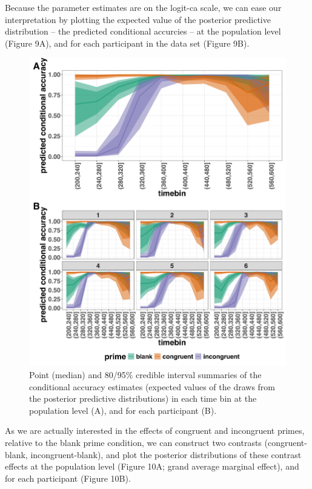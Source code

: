 \documentclass[
  man, donotrepeattitle,floatsintext]{apa6}
\begin{document}
Because the parameter estimates are on the logit-ca scale, we can ease our interpretation by plotting the expected value of the posterior predictive distribution -- the predicted conditional accurcies -- at the population level (Figure 9A), and for each participant in the data set (Figure 9B).



\begin{figure}[H]

{\centering \includegraphics[width=0.8\linewidth,height=0.67\textheight,]{../Tutorial_2_Bayesian/figures/M1i_ca_pred_combined} 

}

\caption{Point (median) and 80/95\% credible interval summaries of the conditional accuracy estimates (expected values of the draws from the posterior predictive distributions) in each time bin at the population level (A), and for each participant (B).}\label{fig:plot-pred-grand-effects-ca}
\end{figure}

As we are actually interested in the effects of congruent and incongruent primes, relative to the blank prime condition, we can construct two contrasts (congruent-blank, incongruent-blank), and plot the posterior distributions of these contrast effects at the population level (Figure 10A; grand average marginal effect), and for each participant (Figure 10B).
\end{document}
